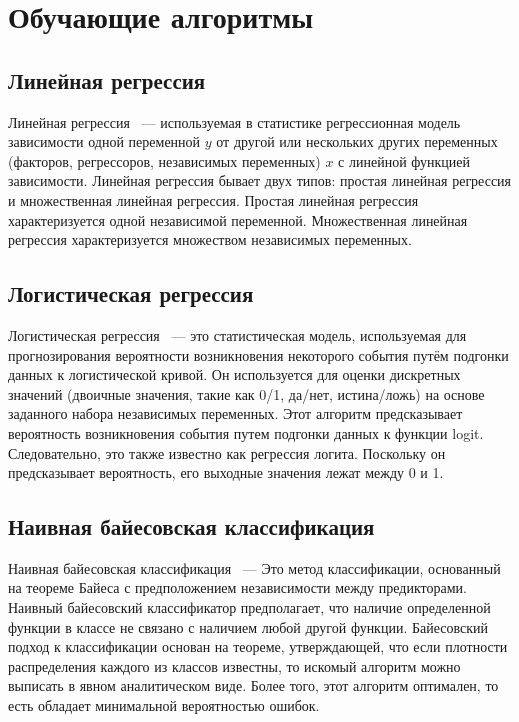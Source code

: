 \section{Обучающие алгоритмы}

\subsection*{Линейная регрессия} 
\indent \indent Линейная регрессия ~--- используемая в статистике регрессионная модель зависимости одной переменной $y$ от другой или нескольких других переменных (факторов, регрессоров, независимых переменных) $x$ с линейной функцией зависимости. Линейная регрессия бывает двух типов: простая линейная регрессия и множественная линейная регрессия. Простая линейная регрессия характеризуется одной независимой переменной. Множественная линейная регрессия характеризуется множеством независимых переменных.

\subsection*{Логистическая регрессия} 
\indent \indent Логистическая регрессия ~--- это статистическая модель, используемая для прогнозирования вероятности возникновения некоторого события путём подгонки данных к логистической кривой. Он используется для оценки дискретных значений (двоичные значения, такие как 0/1, да/нет, истина/ложь) на основе заданного набора независимых переменных. Этот алгоритм предсказывает вероятность возникновения события путем подгонки данных к функции logit. Следовательно, это также известно как регрессия логита. Поскольку он предсказывает вероятность, его выходные значения лежат между 0 и 1.

\subsection*{Наивная байесовская классификация}
\indent \indent Наивная байесовская классификация ~--- Это метод классификации, основанный на  теореме Байеса с предположением независимости между предикторами. Наивный байесовский классификатор предполагает, что наличие определенной функции в классе не связано с наличием любой другой функции. Байесовский подход к классификации основан на теореме, утверждающей, что если плотности распределения каждого из классов известны, то искомый алгоритм можно выписать в явном аналитическом виде. Более того, этот алгоритм оптимален, то есть обладает минимальной вероятностью ошибок.
